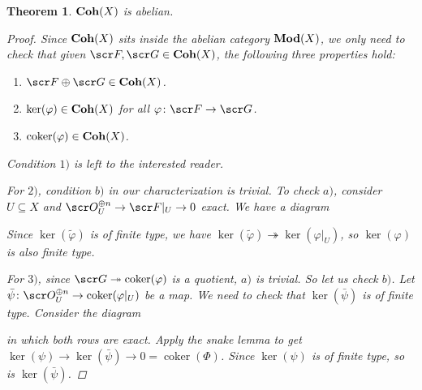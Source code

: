 \documentclass[A4paper, british, reqno]{amsart}
\theoremstyle{darkgreentheorem}
\newtheorem{thm}{Theorem}[section]
\theoremstyle{darkbluedefinition}
\theoremstyle{darkredexample}
\theoremstyle{remark}
\DeclareMathOperator{\im}{im}
\DeclareMathOperator{\coker}{coker}
\newcommand{\1}{\mathbbm{1}}
\newcommand{\op}{\oplus}
\newcommand{\sub}{\subseteq}
\newcommand{\epi}{\twoheadrightarrow}
\begin{document}
\begin{thm}
    $\mathbf{Coh}(X)$ is abelian.
    \begin{proof}
	Since $\mathbf{Coh}(X)$ sits inside the abelian category $\mathbf{Mod}(X)$, we only need to check that given $\F,\G\in \Coh(X)$, the following three properties hold:
	\begin{enumerate}
	    \item $\F\op \G\in \Coh(X)$.
	    \item $\ker(\varphi)\in \mathbf{Coh}(X)$ for all $\varphi\colon \F\to \G$.
	    \item $\coker(\varphi)\in \Coh(X)$.
	\end{enumerate}
	Condition $1)$ is left to the interested reader.

	For $2)$, condition $b)$ in our characterization is trivial.
	To check $a)$, consider $U\sub X$ and $\O_{U}^{\op n}\to \F|_{U}\to 0$ exact.
	We have a diagram
	\begin{center}
	\end{center}
	Since $\ker(\tilde{\varphi})$ is of finite type, we have $\ker(\tilde{\varphi})\epi \ker(\varphi|_{U})$, so $\ker(\varphi)$ is also finite type.
	
	For $3)$, since $\G\epi \coker(\varphi)$ is a quotient, $a)$ is trivial.
	So let us check $b)$.
	Let $\bar{\psi}\colon \O_{U}^{\op n}\to \coker(\varphi|_{U})$ be a map.
	We need to check that $\ker(\bar{\psi})$ is of finite type.
	Consider the diagram
	\begin{center}
	\end{center}
	in which both rows are exact.
	Apply the snake lemma to get $\ker(\psi)\to \ker(\bar{\psi})\to 0=\coker(\Phi)$.
	Since $\ker(\psi)$ is of finite type, so is $\ker(\bar{\psi})$.
    \end{proof}
\end{thm}
\end{document}
